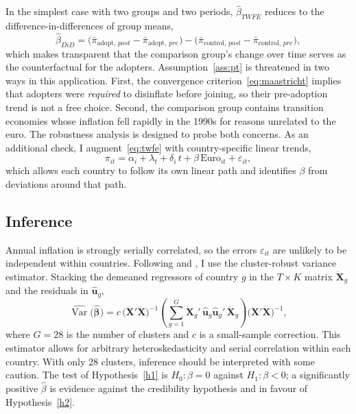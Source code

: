 \documentclass[11pt,a4paper]{article}
\numberwithin{equation}{section}
\theoremstyle{definition}
\theoremstyle{remark}
\begin{document}
In the simplest case with two groups and two periods, $\hat{\beta}_{TWFE}$ reduces to the difference-in-differences of group means,
\begin{equation}
\hat{\beta}_{DiD} = \big(\bar{\pi}_{\text{adopt},\,post} - \bar{\pi}_{\text{adopt},\,pre}\big) - \big(\bar{\pi}_{\text{control},\,post} - \bar{\pi}_{\text{control},\,pre}\big),
\label{eq:did}
\end{equation}
which makes transparent that the comparison group's change over time serves as the counterfactual for the adopters. Assumption~\ref{ass:pt} is threatened in two ways in this application. First, the convergence criterion~\eqref{eq:maastricht} implies that adopters were \emph{required} to disinflate before joining, so their pre-adoption trend is not a free choice. Second, the comparison group contains transition economies whose inflation fell rapidly in the 1990s for reasons unrelated to the euro. The robustness analysis is designed to probe both concerns. As an additional check, I augment~\eqref{eq:twfe} with country-specific linear trends,
\begin{equation}
\pi_{it} = \alpha_i + \lambda_t + \delta_i\, t + \beta\,\text{Euro}_{it} + \varepsilon_{it},
\label{eq:trends}
\end{equation}
which allows each country to follow its own linear path and identifies $\beta$ from deviations around that path.

\subsection{Inference}
Annual inflation is strongly serially correlated, so the errors $\varepsilon_{it}$ are unlikely to be independent within countries. Following \citet{bertrand2004} and \citet{cameron2015}, I use the cluster-robust variance estimator. Stacking the demeaned regressors of country $g$ in the $T\times K$ matrix $\ddot{\mathbf{X}}_g$ and the residuals in $\hat{\mathbf{u}}_g$,
\begin{equation}
\widehat{\operatorname{Var}}\big(\hat{\bm{\beta}}\big)
= c\,\Big(\ddot{\mathbf{X}}'\ddot{\mathbf{X}}\Big)^{-1}
\left(\sum_{g=1}^{G}\ddot{\mathbf{X}}_g'\,\hat{\mathbf{u}}_g\hat{\mathbf{u}}_g'\,\ddot{\mathbf{X}}_g\right)
\Big(\ddot{\mathbf{X}}'\ddot{\mathbf{X}}\Big)^{-1},
\label{eq:cluster}
\end{equation}
where $G=28$ is the number of clusters and $c$ is a small-sample correction. This estimator allows for arbitrary heteroskedasticity and serial correlation within each country. With only 28 clusters, inference should be interpreted with some caution. The test of Hypothesis~\ref{h1} is $H_0\!:\beta = 0$ against $H_1\!:\beta<0$; a significantly positive $\hat{\beta}$ is evidence against the credibility hypothesis and in favour of Hypothesis~\ref{h2}.
\end{document}
